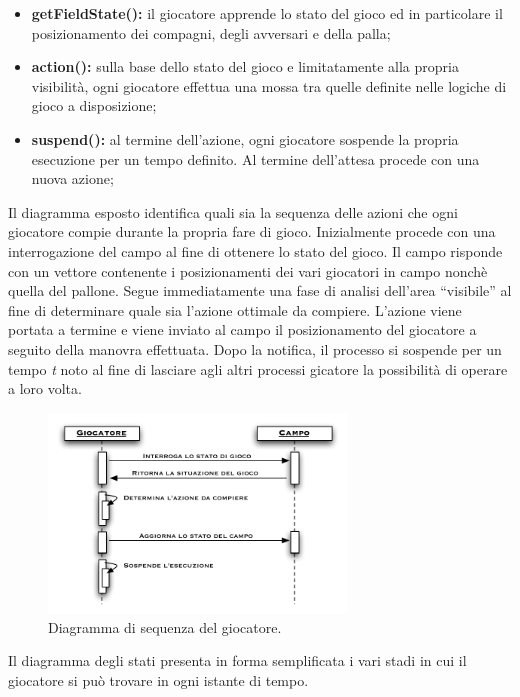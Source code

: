 \documentclass[aps,letterpaper,10pt]{article}
\begin{document}
\begin{itemize}
\item \textbf{getFieldState():} il giocatore apprende lo stato del gioco ed in particolare il posizionamento dei
compagni, degli avversari e della palla;
\item \textbf{action():} sulla base dello stato del gioco e limitatamente alla propria visibilit\`a, ogni giocatore
effettua una mossa tra quelle definite nelle logiche di gioco a disposizione;
\item \textbf{suspend():} al termine dell'azione, ogni giocatore sospende la propria esecuzione per un tempo definito.
Al termine dell'attesa procede con una nuova azione;
\end{itemize}

Il diagramma esposto identifica quali sia la sequenza delle azioni che ogni giocatore compie durante la propria fare di
gioco. Inizialmente procede con una interrogazione del campo al fine di ottenere lo stato del gioco. Il campo risponde
con un vettore contenente i posizionamenti dei vari giocatori in campo nonch\`e quella del pallone. Segue immediatamente
una fase di analisi dell'area ``visibile'' al fine di determinare quale sia l'azione ottimale da compiere. L'azione
viene portata a termine e viene inviato al campo il posizionamento del giocatore a seguito della manovra effettuata.
Dopo la notifica, il processo si sospende per un tempo \emph{t} noto al fine di lasciare agli altri processi gicatore la
possibilit\`a di operare a loro volta.

\begin{figure}[H]
	\begin{center}
		\includegraphics[width=300px]{images/sequence-player.pdf}
	\end{center}
\caption{Diagramma di sequenza del giocatore.}
\end{figure}

Il diagramma degli stati presenta in forma semplificata i vari stadi in cui il giocatore si pu\`o trovare in ogni
istante di tempo. \vspace{3mm}
\end{document}
